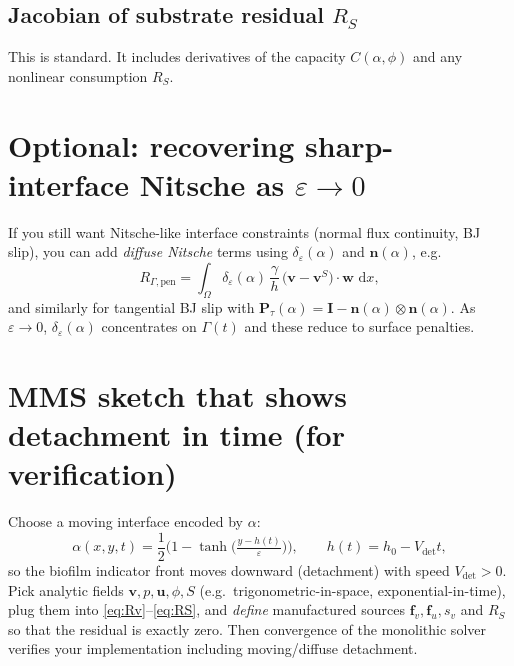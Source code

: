 \documentclass[11pt]{article}
\newcommand{\dd}{\,\mathrm{d}}
\newcommand{\I}{\bm{I}}
\newcommand{\n}{\bm{n}}
\newcommand{\ds}{\delta_\varepsilon}
\begin{document}
\subsection{Jacobian of substrate residual $R_S$}
This is standard. It includes derivatives of the capacity $C(\alpha,\phi)$ and any nonlinear consumption $R_S$.

\section{Optional: recovering sharp-interface Nitsche as $\varepsilon\to 0$}

If you still want Nitsche-like interface constraints (normal flux continuity, BJ slip),
you can add \emph{diffuse Nitsche} terms using $\ds(\alpha)$ and $\n(\alpha)$, e.g.
\[
R_{\Gamma,\text{pen}} = \int_\Omega \ds(\alpha)\,\frac{\gamma}{h}\,\big(\bm{v}-\bm{v}^S\big)\cdot\bm{w}\,\dd x,
\]
and similarly for tangential BJ slip with $\bm{P}_\tau(\alpha)=\I-\n(\alpha)\otimes\n(\alpha)$.
As $\varepsilon\to 0$, $\ds(\alpha)$ concentrates on $\Gamma(t)$ and these reduce to surface penalties.

\section{MMS sketch that shows detachment in time (for verification)}

Choose a moving interface encoded by $\alpha$:
\[
\alpha(x,y,t)=\frac{1}{2}\Big(1-\tanh\big(\tfrac{y-h(t)}{\varepsilon}\big)\Big),
\qquad h(t)=h_0 - V_{\det}t,
\]
so the biofilm indicator front moves downward (detachment) with speed $V_{\det}>0$.
Pick analytic fields $\bm{v},p,\bm{u},\phi,S$ (e.g.\ trigonometric-in-space, exponential-in-time),
plug them into \eqref{eq:Rv}--\eqref{eq:RS}, and \emph{define} manufactured sources $\bm{f}_v,\bm{f}_u,s_v$ and $R_S$ so that the residual is exactly zero.
Then convergence of the monolithic solver verifies your implementation including moving/diffuse detachment.
\end{document}
